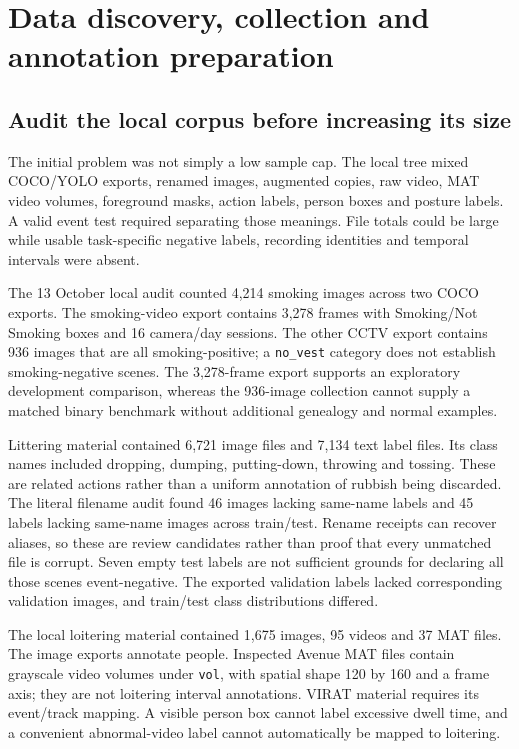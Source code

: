 \chapter{Data discovery, collection and annotation preparation}
\label{ch:data}
\section{Audit the local corpus before increasing its size}
The initial problem was not simply a low sample cap. The local  tree mixed COCO/YOLO exports, renamed images, augmented copies, raw video, MAT video volumes, foreground masks, action labels, person boxes and posture labels. A valid event test required separating those meanings. File totals could be large while usable task-specific negative labels, recording identities and temporal intervals were absent.

The 13 October local audit counted 4,214 smoking images across two COCO exports. The smoking-video export contains 3,278 frames with Smoking/Not Smoking boxes and 16 camera/day sessions. The other CCTV export contains 936 images that are all smoking-positive; a \texttt{no\_vest} category does not establish smoking-negative scenes. The 3,278-frame export supports an exploratory development comparison, whereas the 936-image collection cannot supply a matched binary benchmark without additional genealogy and normal examples.

Littering material contained 6,721 image files and 7,134 text label files. Its class names included dropping, dumping, putting-down, throwing and tossing. These are related actions rather than a uniform annotation of rubbish being discarded. The literal filename audit found 46 images lacking same-name labels and 45 labels lacking same-name images across train/test. Rename receipts can recover aliases, so these are review candidates rather than proof that every unmatched file is corrupt. Seven empty test labels are not sufficient grounds for declaring all those scenes event-negative. The exported validation labels lacked corresponding validation images, and train/test class distributions differed.

The local loitering material contained 1,675 images, 95 videos and 37 MAT files. The image exports annotate people. Inspected Avenue MAT files contain grayscale video volumes under \texttt{vol}, with spatial shape 120 by 160 and a frame axis; they are not loitering interval annotations. VIRAT material requires its event/track mapping. A visible person box cannot label excessive dwell time, and a convenient abnormal-video label cannot automatically be mapped to loitering.

